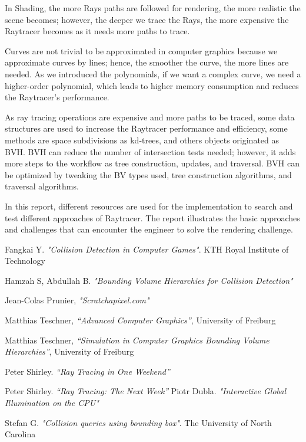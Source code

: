 \documentclass{article}
\begin{document}
	In Shading, the more Rays paths are followed for rendering, the more realistic the scene becomes; however, the deeper we trace the Rays, the more expensive the Raytracer becomes as it needs more paths to trace. 
	
	Curves are not trivial to be approximated in computer graphics because we approximate curves by lines; hence, the smoother the curve, the more lines are needed. As we introduced the polynomials, if we want a complex curve, we need a higher-order polynomial, which leads to higher memory consumption and reduces the Raytracer's performance. 
	
	As ray tracing operations are expensive and more paths to be traced, some data structures are used to increase the Raytracer performance and efficiency, some methods are space subdivisions as kd-trees, and others objects originated as BVH. BVH can reduce the number of intersection tests needed; however, it adds more steps to the workflow as tree construction, updates, and traversal.  BVH can be optimized by tweaking the BV types used, tree construction algorithms, and traversal algorithms.
	
	In this report, different resources are used for the implementation to search and test different approaches of Raytracer.  The report illustrates the basic approaches and challenges that can encounter the engineer to solve the rendering challenge. 
	
	
	\clearpage
	
	\begin{thebibliography}{9}
		Fangkai Y. 	\textit{"Collision Detection in Computer Games"}. KTH Royal Institute of Technology
		
		Hamzah S, Abdullah B. 	\textit{"Bounding Volume Hierarchies for Collision Detection"}
		
		Jean-Colas Prunier,	\textit{"Scratchapixel.com"}
		
		Matthias Teschner, 	\textit{“Advanced Computer Graphics”}, University of Freiburg
		
		Matthias Teschner, 	\textit{“Simulation in Computer Graphics Bounding Volume Hierarchies”}, University of Freiburg
		
		
		Peter Shirley. 	\textit{“Ray Tracing in One Weekend”}
		
		Peter Shirley. 	\textit{“Ray Tracing: The Next Week”}
		Piotr Dubla. 	\textit{"Interactive Global Illumination on the CPU"}
		
		
		Stefan G.	\textit{"Collision queries using bounding box"}. The University of North Carolina
		
		
		
		
	\end{thebibliography}
	
	
\end{document}
